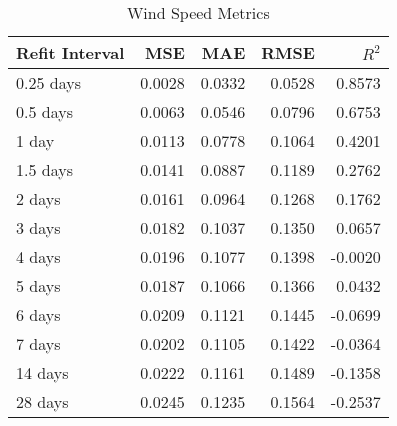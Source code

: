 \begin{table}[htbp]
    \centering
    \caption{Wind Speed Metrics}
    \label{tab:wind-speed}
    \begin{tabular}{|l|r|r|r|r|}
        \hline
        \textbf{Refit Interval} & \textbf{MSE} & \textbf{MAE} & \textbf{RMSE} & \textbf{\(R^2\)} \\
        \hline
        0.25 days & 0.0028 & 0.0332 & 0.0528 & 0.8573 \\
        0.5 days  & 0.0063 & 0.0546 & 0.0796 & 0.6753 \\
        1 day     & 0.0113 & 0.0778 & 0.1064 & 0.4201 \\
        1.5 days  & 0.0141 & 0.0887 & 0.1189 & 0.2762 \\
        2 days    & 0.0161 & 0.0964 & 0.1268 & 0.1762 \\
        3 days    & 0.0182 & 0.1037 & 0.1350 & 0.0657 \\
        4 days    & 0.0196 & 0.1077 & 0.1398 & -0.0020 \\
        5 days    & 0.0187 & 0.1066 & 0.1366 & 0.0432 \\
        6 days    & 0.0209 & 0.1121 & 0.1445 & -0.0699 \\
        7 days    & 0.0202 & 0.1105 & 0.1422 & -0.0364 \\
        14 days   & 0.0222 & 0.1161 & 0.1489 & -0.1358 \\
        28 days   & 0.0245 & 0.1235 & 0.1564 & -0.2537 \\
        \hline
    \end{tabular}
\end{table}
